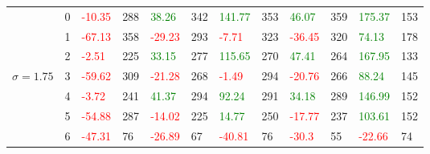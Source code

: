 \begin{table}[!htb]
\begin{adjustwidth}{-0.8in}{-0.9in}
\begin{tabular}{|p{4em}|p{2em}|p{3em}|p{3em}|p{3em}|p{3em}|p{3em}|p{3em}|p{3em}|p{3em}|p{3em}|p{3em}|}
            & 0 & \textcolor{red}{-10.35} & 288 & \textcolor{green}{38.26} & 342 & \textcolor{green}{141.77} & 353 & \textcolor{green}{46.07} & 359 & \textcolor{green}{175.37} & 153\\\cline{3-12}
            & 1 & \textcolor{red}{-67.13} & 358 & \textcolor{red}{-29.23} & 293 & \textcolor{red}{-7.71} & 323 & \textcolor{red}{-36.45} & 320 & \textcolor{green}{74.13} & 178\\\cline{3-12}
            & 2 & \textcolor{red}{-2.51} & 225 & \textcolor{green}{33.15} & 277 & \textcolor{green}{115.65} & 270 & \textcolor{green}{47.41} & 264 & \textcolor{green}{167.95} & 133\\\cline{3-12}
            $\sigma=1.75$& 3 & \textcolor{red}{-59.62} & 309 & \textcolor{red}{-21.28} & 268 & \textcolor{red}{-1.49} & 294 & \textcolor{red}{-20.76} & 266 & \textcolor{green}{88.24} & 145\\\cline{3-12}
            & 4 & \textcolor{red}{-3.72} & 241 & \textcolor{green}{41.37} & 294 & \textcolor{green}{92.24} & 291 & \textcolor{green}{34.18} & 289 & \textcolor{green}{146.99} & 152\\\cline{3-12}
            & 5 & \textcolor{red}{-54.88} & 287 & \textcolor{red}{-14.02} & 225 & \textcolor{green}{14.77} & 250 & \textcolor{red}{-17.77} & 237 & \textcolor{green}{103.61} & 152\\\cline{3-12}
            & 6 & \textcolor{red}{-47.31} & 76 & \textcolor{red}{-26.89} & 67 & \textcolor{red}{-40.81} & 76 & \textcolor{red}{-30.3} & 55 & \textcolor{red}{-22.66} & 74\\\hline\hline
            

\end{tabular}
\end{adjustwidth}
\end{table}
